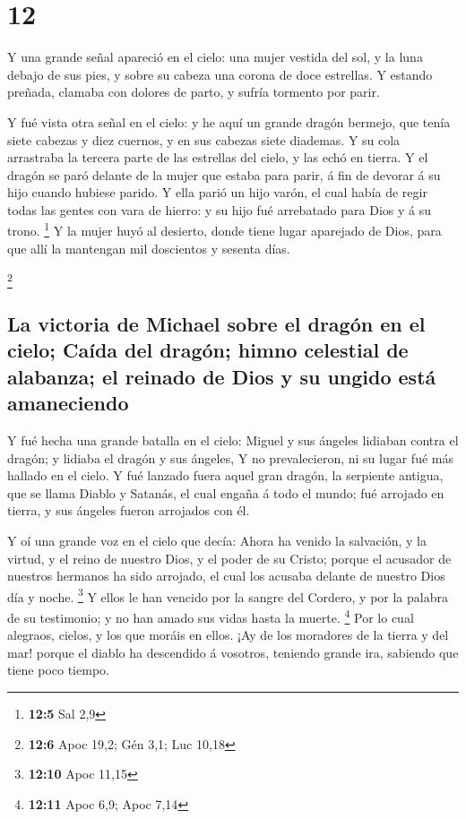 \hypertarget{section-11}{%
\section{12}\label{section-11}}

 Y una grande señal apareció en el cielo: una mujer vestida
del sol, y la luna debajo de sus pies, y sobre su cabeza una corona de
doce estrellas.  Y estando preñada, clamaba con dolores de
parto, y sufría tormento por parir.

 Y fué vista otra señal en el cielo: y he aquí un grande
dragón bermejo, que tenía siete cabezas y diez cuernos, y en sus cabezas
siete diademas.  Y su cola arrastraba la tercera parte de
las estrellas del cielo, y las echó en tierra. Y el dragón se paró
delante de la mujer que estaba para parir, á fin de devorar á su hijo
cuando hubiese parido.  Y ella parió un hijo varón, el cual
había de regir todas las gentes con vara de hierro: y su hijo fué
arrebatado para Dios y á su trono. \footnote{\textbf{12:5} Sal 2,9}
 Y la mujer huyó al desierto, donde tiene lugar aparejado de
Dios, para que allí la mantengan mil doscientos y sesenta días.

\footnote{\textbf{12:6} Apoc 19,2; Gén 3,1; Luc 10,18}

\hypertarget{la-victoria-de-michael-sobre-el-draguxf3n-en-el-cielo-cauxedda-del-draguxf3n-himno-celestial-de-alabanza-el-reinado-de-dios-y-su-ungido-estuxe1-amaneciendo}{%
\subsection{La victoria de Michael sobre el dragón en el cielo; Caída
del dragón; himno celestial de alabanza; el reinado de Dios y su ungido
está
amaneciendo}\label{la-victoria-de-michael-sobre-el-draguxf3n-en-el-cielo-cauxedda-del-draguxf3n-himno-celestial-de-alabanza-el-reinado-de-dios-y-su-ungido-estuxe1-amaneciendo}}

 Y fué hecha una grande batalla en el cielo: Miguel y sus
ángeles lidiaban contra el dragón; y lidiaba el dragón y sus ángeles,
 Y no prevalecieron, ni su lugar fué más hallado en el
cielo.  Y fué lanzado fuera aquel gran dragón, la serpiente
antigua, que se llama Diablo y Satanás, el cual engaña á todo el mundo;
fué arrojado en tierra, y sus ángeles fueron arrojados con él.

 Y oí una grande voz en el cielo que decía: Ahora ha venido
la salvación, y la virtud, y el reino de nuestro Dios, y el poder de su
Cristo; porque el acusador de nuestros hermanos ha sido arrojado, el
cual los acusaba delante de nuestro Dios día y noche. \footnote{\textbf{12:10}
  Apoc 11,15}  Y ellos le han vencido por la sangre del
Cordero, y por la palabra de su testimonio; y no han amado sus vidas
hasta la muerte. \footnote{\textbf{12:11} Apoc 6,9; Apoc 7,14}
 Por lo cual alegraos, cielos, y los que moráis en ellos.
¡Ay de los moradores de la tierra y del mar! porque el diablo ha
descendido á vosotros, teniendo grande ira, sabiendo que tiene poco
tiempo.

